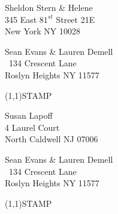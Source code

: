 \documentclass[12pt]{article}
\begin{document}
\begin{center} \begin{Huge} \vspace*{\fill}
Sheldon Stern \& Helene\\
345 East $81^{st}$ Street 21E\\
New York NY 10028\\
\vspace{\fill} \end{Huge} \end{center}

\clearpage

\begin{minipage}{.5\linewidth} \noindent
Sean Evans \& Lauren Demell\\\ 
134 Crescent Lane\\ 
Roslyn Heights NY 11577
\end{minipage}
\begin{minipage}{.5\linewidth \hspace{-.2in} \vspace{-.3in}}
\begin{flushright}
\framebox(1,1){STAMP}
\end{flushright}
\end{minipage}

\begin{center} \begin{Huge} \vspace*{\fill}
Susan Lapoff\\
4 Laurel Court\\
North Caldwell NJ 07006\\
\vspace{\fill} \end{Huge} \end{center}

\clearpage

\begin{minipage}{.5\linewidth} \noindent
Sean Evans \& Lauren Demell\\\ 
134 Crescent Lane\\ 
Roslyn Heights NY 11577
\end{minipage}
\begin{minipage}{.5\linewidth \hspace{-.2in} \vspace{-.3in}}
\begin{flushright}
\framebox(1,1){STAMP}
\end{flushright}
\end{minipage}
\end{document}
